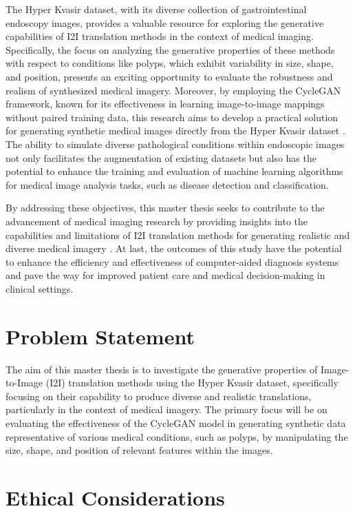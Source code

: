 \documentclass[UKenglish,12pt]{master-style}
\begin{document}
The Hyper Kvasir dataset, with its diverse collection of gastrointestinal endoscopy images, provides a valuable resource for exploring the generative capabilities of I2I translation methods in the context of medical imaging. Specifically, the focus on analyzing the generative properties of these methods with respect to conditions like polyps, which exhibit variability in size, shape, and position, presents an exciting opportunity to evaluate the robustness and realism of synthesized medical imagery. Moreover, by employing the CycleGAN framework, known for its effectiveness in learning image-to-image mappings without paired training data, this research aims to develop a practical solution for generating synthetic medical images directly from the Hyper Kvasir dataset \cite{CycleGAN} . The ability to simulate diverse pathological conditions within endoscopic images not only facilitates the augmentation of existing datasets but also has the potential to enhance the training and evaluation of machine learning algorithms for medical image analysis tasks, such as disease detection and classification.

By addressing these objectives, this master thesis seeks to contribute to the advancement of medical imaging research by providing insights into the capabilities and limitations of I2I translation methods for generating realistic and diverse medical imagery \cite{I2I} . At last, the outcomes of this study have the potential to enhance the efficiency and effectiveness of computer-aided diagnosis systems and pave the way for improved patient care and medical decision-making in clinical settings.

\section{Problem Statement}

The aim of this master thesis is to investigate the generative properties of Image-to-Image (I2I) translation methods using the Hyper Kvasir dataset, specifically focusing on their capability to produce diverse and realistic translations, particularly in the context of medical imagery. The primary focus will be on evaluating the effectiveness of the CycleGAN model in generating synthetic data representative of various medical conditions, such as polyps, by manipulating the size, shape, and position of relevant features within the images.

\section{Ethical Considerations}
\end{document}
